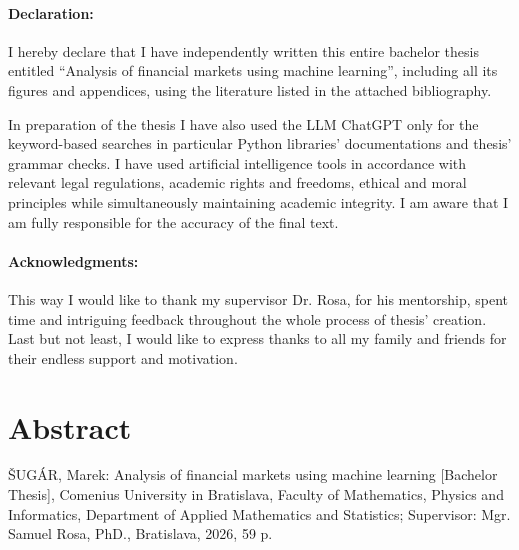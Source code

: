 \documentclass[12pt, oneside]{book}  %
\def\mfnazov{Analysis of financial markets using machine learning}
\begin{document}






\newpage
\pagestyle{plain}
\paragraph{Declaration:}
I hereby declare that I have independently written this entire
bachelor thesis entitled ``\mfnazov'', including all its
figures and appendices, using the literature listed in the attached
bibliography.

In preparation of the thesis I have also used the LLM ChatGPT
only for the keyword-based searches in particular Python libraries' documentations 
and thesis' grammar checks. I have used artificial intelligence tools in accordance with relevant
legal regulations, academic rights and freedoms, ethical and moral
principles while simultaneously maintaining academic integrity. I am
aware that I am fully responsible for the accuracy of the final text.

\paragraph{Acknowledgments:} This way I would like to thank my supervisor Dr. Rosa, for his mentorship, spent time and intriguing feedback throughout the whole process of thesis' creation.
Last but not least, I would like to express thanks to all my family and friends for their endless support and motivation.


\newpage 
\section*{Abstract}

ŠUGÁR, Marek: Analysis of financial markets using machine learning [Bachelor Thesis], Comenius University in Bratislava, Faculty of Mathematics, Physics and Informatics,
Department of Applied Mathematics and Statistics; Supervisor: Mgr. Samuel Rosa, PhD., Bratislava, 2026, 59 p.
\end{document}
